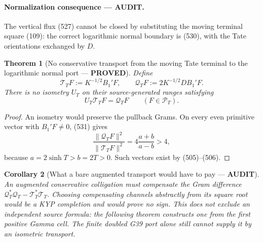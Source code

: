 \documentclass[11pt]{article}
\newtheorem{theorem}{Theorem}
\newtheorem{corollary}[theorem]{Corollary}
\newcommand{\PROVED}{\textcolor{green!45!black}{\textbf{PROVED}}}
\newcommand{\AUDIT}{\textcolor{orange!75!black}{\textbf{AUDIT}}}
\begin{document}
\paragraph{Normalization consequence --- \AUDIT.}
The vertical flux (527) cannot be closed by substituting the moving
terminal square (109): the correct logarithmic normal boundary is (530),
with the Tate orientations exchanged by \(D\).

\begin{theorem}[No conservative transport from the moving Tate terminal to
the logarithmic normal port --- \PROVED]
Define
\begin{equation}
 \mathcal T_TF:=K^{-1/2}B_1'F,\qquad
 \mathcal Q_TF:=2K^{-1/2}DB_1'F.                      \tag{532}
\end{equation}
There is no isometry \(U_T\) on their source-generated ranges satisfying
\begin{equation}
 U_T\mathcal T_TF=\mathcal Q_TF
 \qquad(F\in\mathcal P_T).                            \tag{533}
\end{equation}
\end{theorem}

\begin{proof}
An isometry would preserve the pullback Grams.  On every even primitive
vector with \(B_1'F\ne0\), (531) gives
\begin{equation}
 \frac{\|\mathcal Q_TF\|^2}{\|\mathcal T_TF\|^2}
 =4\frac{a+b}{a-b}>4,                                \tag{534}
\end{equation}
because \(a=2\sinh T>b=2T>0\).  Such vectors exist by (505)--(506).
\end{proof}

\begin{corollary}[What a bare augmented transport would have to pay ---
\AUDIT]
An augmented conservative colligation must compensate the Gram difference
\(\mathcal Q_T^*\mathcal Q_T-\mathcal T_T^*\mathcal T_T\).
Choosing compensating channels abstractly from its square root would be a
KYP completion and would prove no sign.  This does not exclude an
independent source formula: the following theorem constructs one from the
first positive Gamma cell.  The finite doubled G39 port alone still cannot
supply it by an isometric transport.
\end{corollary}
\end{document}
